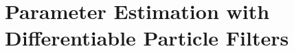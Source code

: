 \documentclass{article}
\begin{document}

\clearpage


\newpage
\section{Parameter Estimation with Differentiable Particle Filters}
\label{sec:param-estimation}
\end{document}
